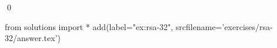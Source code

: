 
\begin{ex} 
  \label{ex:rsa-32}
  
  \qed
\end{ex} 
\begin{python0}
from solutions import *
add(label="ex:rsa-32",
    srcfilename='exercises/rsa-32/answer.tex') 
\end{python0}

